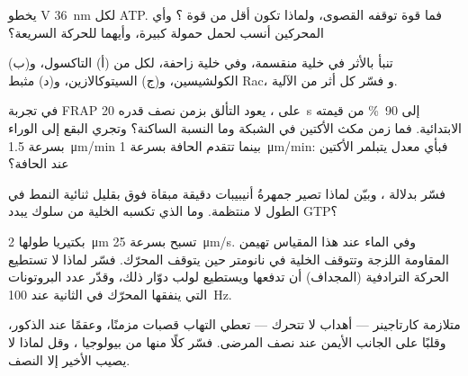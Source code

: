 \begin{exercise}[$\star\star$]\label{exo:b3:cytoskeleton-motility:7}
يخطو  V \qty{36}{nm} لكل ATP. فما قوة توقفه القصوى،
ولماذا تكون أقل من قوة ؟ وأي المحركين أنسب
لحمل حمولة كبيرة، وأيهما للحركة السريعة؟
\end{exercise}

\begin{exercise}[$\star\star$]\label{exo:b3:cytoskeleton-motility:8}
تنبأ بالأثر في خلية منقسمة، وفي خلية زاحفة، لكل من (أ)
التاكسول، و(ب) الكولشيسين، و(ج) السيتوكالازين، و(د) مثبط Rac، و
فسّر كل أثر من الآلية.
\end{exercise}

\begin{exercise}[$\star\star$]\label{exo:b3:cytoskeleton-motility:9}
في تجربة FRAP على ، يعود التألق بزمن
نصف قدره \qty{20}{s} إلى \qty{90}{\%} من قيمته الابتدائية. فما
زمن مكث الأكتين في الشبكة وما النسبة الساكنة؟
وتجري البقع إلى الوراء بسرعة \qty{1.5}{\micro m/min} بينما تتقدم الحافة
بسرعة \qty{1}{\micro m/min}: فبأي معدل يتبلمر الأكتين
عند الحافة؟
\end{exercise}

\begin{exercise}[$\star\star\star$]\label{exo:b3:cytoskeleton-motility:10}
فسّر  بدلالة ، وبيّن لماذا
تصير جمهرةُ أنيبيبات دقيقة مبقاة فوق  بقليل
ثنائية النمط في الطول لا منتظمة. وما الذي تكسبه الخلية
من سلوك يبدد GTP؟
\end{exercise}

\begin{exercise}[$\star\star\star$]\label{exo:b3:cytoskeleton-motility:11}
بكتيريا طولها \qty{2}{\micro m} تسبح بسرعة \qty{25}{\micro m/s}. وفي
الماء عند هذا المقياس تهيمن المقاومة اللزجة وتتوقف الخلية في
نانومتر حين يتوقف المحرّك. فسّر لماذا لا تستطيع الحركة الترادفية
(المجداف) أن تدفعها ويستطيع لولب دوّار ذلك، وقدّر
عدد البروتونات التي ينفقها المحرّك في الثانية عند \qty{100}{Hz}.
\end{exercise}

\begin{exercise}[$\star\star\star$]\label{exo:b3:cytoskeleton-motility:12}
متلازمة كارتاجينر --- أهداب لا تتحرك --- تعطي التهاب قصبات مزمنًا،
وعقمًا عند الذكور، وقلبًا على الجانب الأيمن عند نصف المرضى.
فسّر كلًا منها من بيولوجيا ، وقل لماذا لا يصيب الأخير
إلا النصف.
\end{exercise}

